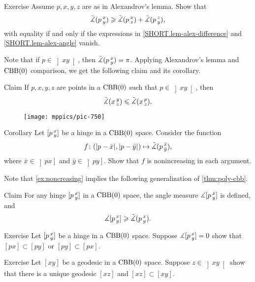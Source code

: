 \begin{thm}{Exercise}\label{ex:alex-lemma-cat}
Assume $p,x,y,z$ are as in Alexandrov's lemma.
Show that
\[\tilde\measuredangle(p\,{}^{x}_{y})
\geqslant
\tilde\measuredangle(p\,{}^{x}_{z}) + \tilde\measuredangle(p\,{}^{z}_{y}),\]
with equality if and only if the expressions in \ref{SHORT.lem-alex-difference} and \ref{SHORT.lem-alex-angle} vanish.
\end{thm}

Note that if $p\in\left]x y\right[$, then $\tilde\measuredangle(p\,{}^{x}_{y})=\pi$.
Applying Alexandrov's lemma and $\mathrm{CBB}(0)$ comparison, we get the following claim and its corollary.

\begin{thm}{Claim}\label{clm:angle-mono}
If $p,x,y,z$ are points in a $\mathrm{CBB}(0)$ such that $p\in\left]x y\right[$, then 
\[\tilde\measuredangle(x\,{}^{y}_{z})\leqslant \tilde\measuredangle(x\,{}^{p}_{z}).\]
\end{thm}

\begin{wrapfigure}{r}{25mm}
\vskip-0mm
\centering
\texttt{[image: mppics/pic-750]}
\end{wrapfigure}

\begin{thm}{Corollary}\label{ex:noncreasing}
Let $[p\,{}^{x}_{y}]$ be a hinge in a $\mathrm{CBB}(0)$ space.
Consider the function
\[f\:(\dist{p}{\bar x}{},\dist{p}{\bar y}{})\mapsto \angk p{\bar x}{\bar y},\]
where $\bar x\in\left]p x\right]$ and $\bar y\in\left]p y\right]$.
Show that $f$ is nonincreasing in each argument.
\end{thm}

Note that \ref{ex:noncreasing} implies the following generalization of \ref{thm:poly-cbb}.

\begin{thm}{Claim}\label{clm:angle-defined}
For any hinge $[p\,{}^{x}_{y}]$ in a $\mathrm{CBB}(0)$ space,
the angle measure $\measuredangle[p\,{}^{x}_{y}]$ is defined, and
\[\measuredangle[p\,{}^{x}_{y}]\geqslant \tilde\measuredangle(p\,{}^{x}_{y}).\]

\end{thm}

\begin{thm}{Exercise}\label{ex:0-angle}
Let $[p\,{}^{x}_{y}]$ be a hinge in a $\mathrm{CBB}(0)$ space.
Suppose $\measuredangle[p\,{}^{x}_{y}]=0$ show that $[px]\subset [py]$ or $[py]\subset [px]$.
\end{thm}

\begin{thm}{Exercise}\label{ex:pi-angle}
Let $[xy]$ be a geodesic in a $\mathrm{CBB}(0)$ space.
Suppose $z\in \left]xy\right[$ show that there is a unique geodesic $[xz]$ and $[xz]\subset [xy]$.
\end{thm}


